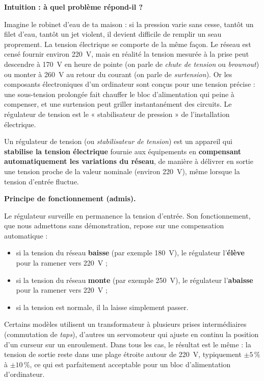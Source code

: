 \documentclass[11pt]{article}
\newcommand{\cle}[1]{{\popxbold\color{popdark}#1}}
\newcounter{popsec}
\newcounter{popsub}
\newcommand{\courssub}[1]{%
  \stepcounter{popsub}%
  \par\vspace{9pt}\noindent{\popxbold\fontsize{11.5}{13}\selectfont\color{popink}{\color{poporange}\thepopsec.\thepopsub}\hspace{6pt}#1}\par\nopagebreak\vspace{4pt}
}
\begin{document}
\courssub{Le régulateur de tension}

\textbf{Intuition : à quel problème répond-il ?}\par

Imagine le robinet d'eau de ta maison : si la pression varie sans cesse, tantôt un filet d'eau, tantôt un jet violent, il devient difficile de remplir un seau proprement. La tension électrique se comporte de la même façon. Le réseau est censé fournir environ \SI{220}{V}, mais en réalité la tension mesurée à la prise peut descendre à \SI{170}{V} en heure de pointe (on parle de \emph{chute de tension} ou \emph{brownout}) ou monter à \SI{260}{V} au retour du courant (on parle de \emph{surtension}). Or les composants électroniques d'un ordinateur sont conçus pour une tension précise : une sous-tension prolongée fait chauffer le bloc d'alimentation qui peine à compenser, et une surtension peut griller instantanément des circuits. Le régulateur de tension est le « stabilisateur de pression » de l'installation électrique.

\begin{definition}
Un \cle{régulateur de tension} (ou \emph{stabilisateur de tension}) est un appareil qui \textbf{stabilise la tension électrique} fournie aux équipements en \textbf{compensant automatiquement les variations du réseau}, de manière à délivrer en sortie une tension proche de la valeur nominale (environ \SI{220}{V}), même lorsque la tension d'entrée fluctue.
\end{definition}

\textbf{Principe de fonctionnement (admis).}

Le régulateur surveille en permanence la tension d'entrée. Son fonctionnement, que nous admettons sans démonstration, repose sur une \cle{compensation automatique} :

\begin{itemize}
\item si la tension du réseau \textbf{baisse} (par exemple \SI{180}{V}), le régulateur l'\textbf{élève} pour la ramener vers \SI{220}{V} ;
\item si la tension du réseau \textbf{monte} (par exemple \SI{250}{V}), le régulateur l'\textbf{abaisse} pour la ramener vers \SI{220}{V} ;
\item si la tension est normale, il la laisse simplement passer.
\end{itemize}

Certains modèles utilisent un transformateur à plusieurs prises intermédiaires (commutation de \emph{taps}), d'autres un servomoteur qui ajuste en continu la position d'un curseur sur un enroulement. Dans tous les cas, le résultat est le même : la tension de sortie reste dans une plage étroite autour de \SI{220}{V}, typiquement $\pm 5\,\%$ à $\pm 10\,\%$, ce qui est parfaitement acceptable pour un bloc d'alimentation d'ordinateur.
\end{document}
